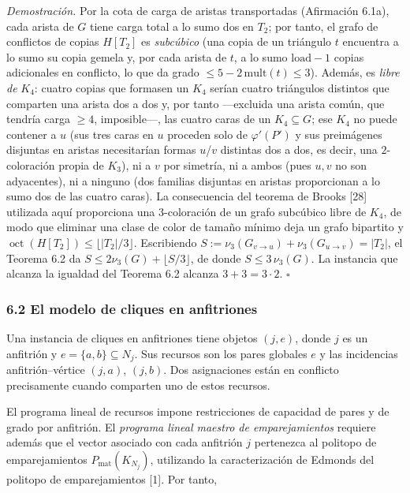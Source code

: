 \documentclass[spanish,11pt,a4paper]{article}
\begin{document}
\emph{Demostración.} Por la cota de carga de aristas transportadas
(Afirmación 6.1a), cada arista de \(G\) tiene carga total a lo sumo dos
en \(T_2\); por tanto, el grafo de conflictos de copias \(H[T_2]\) es
\emph{subcúbico} (una copia de un triángulo \(t\) encuentra a lo sumo su
copia gemela y, por cada arista de \(t\), a lo sumo \(\mathrm{load}-1\)
copias adicionales en conflicto, lo que da grado
\(\le 5-2\,\mathrm{mult}(t)\le 3\)). Además, es \emph{libre de} \(K_4\):
cuatro copias que formasen un \(K_4\) serían cuatro triángulos distintos
que comparten una arista dos a dos y, por tanto ---excluida una arista
común, que tendría carga \(\ge 4\), imposible---, las cuatro caras de un
\(K_4\subseteq G\); ese \(K_4\) no puede contener a \(u\) (sus tres
caras en \(u\) proceden solo de \(\varphi'(P')\) y sus preimágenes
disjuntas en aristas necesitarían formas \(u\)/\(v\) distintas dos a
dos, es decir, una \(2\)-coloración propia de \(K_3\)), ni a \(v\) por
simetría, ni a ambos (pues \(u,v\) no son adyacentes), ni a ninguno (dos
familias disjuntas en aristas proporcionan a lo sumo dos de las cuatro
caras). La consecuencia del teorema de Brooks {[}28{]} utilizada aquí
proporciona una \(3\)-coloración de un grafo subcúbico libre de \(K_4\),
de modo que eliminar una clase de color de tamaño mínimo deja un grafo
bipartito y \(\operatorname{oct}(H[T_2])\le\lfloor|T_2|/3\rfloor\).
Escribiendo \(S:=\nu_3(G_{v\to u})+\nu_3(G_{u\to v})=|T_2|\), el Teorema
6.2 da \(S\le 2\nu_3(G)+\lfloor S/3\rfloor\), de donde
\(S\le 3\,\nu_3(G)\). La instancia que alcanza la igualdad del Teorema
6.2 alcanza \(3+3=3\cdot 2\). \(\square\)

\subsubsection{6.2 El modelo de cliques en
anfitriones}\label{el-modelo-de-cliques-en-anfitriones}

Una instancia de cliques en anfitriones tiene objetos \((j,e)\), donde
\(j\) es un anfitrión y \(e=\{a,b\}\subseteq N_j\). Sus recursos son los
pares globales \(e\) y las incidencias anfitrión--vértice \((j,a)\),
\((j,b)\). Dos asignaciones están en conflicto precisamente cuando
comparten uno de estos recursos.

El programa lineal de recursos impone restricciones de capacidad de
pares y de grado por anfitrión. El \emph{programa lineal maestro de
emparejamientos} requiere además que el vector asociado con cada
anfitrión \(j\) pertenezca al politopo de emparejamientos
\(P_{\mathrm{mat}}(K_{N_j})\), utilizando la caracterización de Edmonds
del politopo de emparejamientos {[}1{]}. Por tanto,
\end{document}
